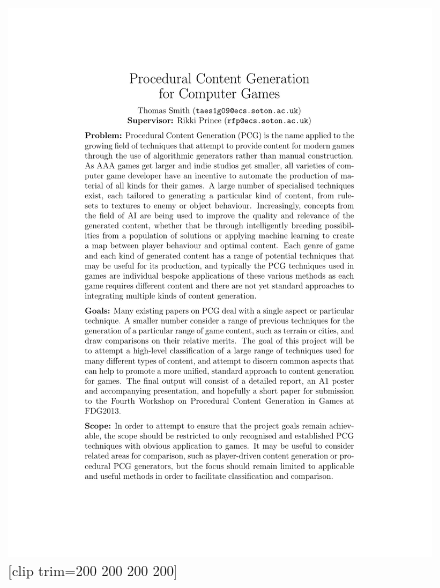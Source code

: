 \documentclass{./acm_proc_article-sp}
\begin{document}


\begin{figure}
\centering
\includegraphics{../Brief/Project Brief.pdf}[clip trim=200 200 200 200]
\end{figure}
\balancecolumns
\end{document}
